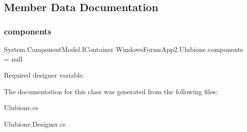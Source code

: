 \subsection{Member Data Documentation}
\mbox{\label{class_windows_forms_app2_1_1_ulubione_a87e8bd4b55cd5b901060d298a6519aaa}} 
\subsubsection{\texorpdfstring{components}{components}}
{\footnotesize\ttfamily System.\+Component\+Model.\+I\+Container Windows\+Forms\+App2.\+Ulubione.\+components = null\hspace{0.3cm}{\ttfamily [private]}}



Required designer variable. 



The documentation for this class was generated from the following files\+:\begin{DoxyCompactItemize}
\item 
Ulubione.\+cs\item 
Ulubione.\+Designer.\+cs\end{DoxyCompactItemize}
